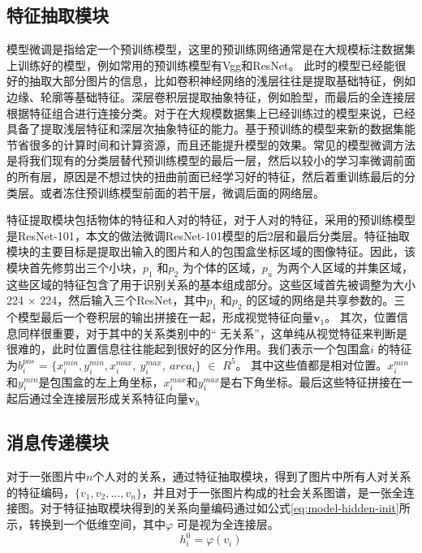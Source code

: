 \subsection{特征抽取模块}


模型微调是指给定一个预训练模型，这里的预训练网络通常是在大规模标注数据集上训练好的模型，例如常用的预训练模型有Vgg和ResNet。 此时的模型已经能很好的抽取大部分图片的信息，比如卷积神经网络的浅层往往是提取基础特征，例如边缘、轮廓等基础特征。深层卷积层提取抽象特征，例如脸型，而最后的全连接层根据特征组合进行连接分类。对于在大规模数据集上已经训练过的模型来说，已经具备了提取浅层特征和深层次抽象特征的能力。基于预训练的模型来新的数据集能节省很多的计算时间和计算资源，而且还能提升模型的效果。常见的模型微调方法是将我们现有的分类层替代预训练模型的最后一层，然后以较小的学习率微调前面的所有层，原因是不想过快的扭曲前面已经学习好的特征，然后着重训练最后的分类层。或者冻住预训练模型前面的若干层，微调后面的网络层。

特征提取模块包括物体的特征和人对的特征，对于人对的特征，采用的预训练模型是ResNet-101\cite{he2016deep}，本文的做法微调ResNet-101模型的后2层和最后分类层。特征抽取模块的主要目标是提取出输入的图片和人的包围盒坐标区域的图像特征。因此，该模块首先修剪出三个小块，$p_1$ 和$p_2$ 为个体的区域，$p_{u}$ 为两个人区域的并集区域，这些区域的特征包含了用于识别关系的基本组成部分。这些区域首先被调整为大小224 $\times$ 224，然后输入三个ResNet，其中$p_1$ 和$p_2$ 的区域的网络是共享参数的。三个模型最后一个卷积层的输出拼接在一起，形成视觉特征向量$\mathbf{v}_1$。 其次，位置信息同样很重要，对于其中的关系类别中的`` 无关系''，这单纯从视觉特征来判断是很难的，此时位置信息往往能起到很好的区分作用。我们表示一个包围盒$i$ 的特征为$b_i^{pos}$ = $\{ x_{i}^{min}, y_{i}^{min}, x_{i}^{max}, ~y_{i}^{max},~ area_{i} \}$ $\in$ $R^5$。 其中这些值都是相对位置。$x_{i}^{min}$和$y_{i}^{min}$是包围盒的左上角坐标，$x_{i}^{max}$和$y_{i}^{max}$是右下角坐标。最后这些特征拼接在一起后通过全连接层形成关系特征向量$\mathbf{v}_h$


\subsection{消息传递模块}

对于一张图片中$n$个人对的关系，通过特征抽取模块，得到了图片中所有人对关系的特征编码，$\{ v_{1},v_{2},...,v_{n} \}$，并且对于一张图片构成的社会关系图谱，是一张全连接图。对于特征抽取模块得到的关系向量编码通过如公式\ref{eq:model-hidden-init}所示，转换到一个低维空间，其中$ \varphi $ 可是视为全连接层。
\begin{equation} \label{eq:model-hidden-init}
    h_{i}^{0} = \varphi (v_{i})
\end{equation}

